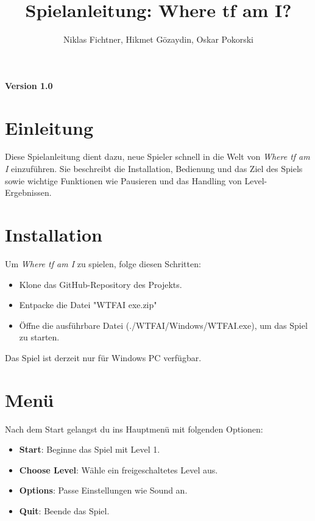 \documentclass[a4paper,12pt]{article}
\title{Spielanleitung: Where tf am I?}
\author{Niklas Fichtner, Hikmet Gözaydin, Oskar Pokorski}
\begin{document}
\maketitle

\begin{center}
\textbf{Version 1.0}
\end{center}

\tableofcontents
\newpage

\section*{Einleitung}
Diese Spielanleitung dient dazu, neue Spieler schnell in die Welt von \textit{Where tf am I} einzuführen. Sie beschreibt die Installation, Bedienung und das Ziel des Spiels sowie wichtige Funktionen wie Pausieren und das Handling von Level-Ergebnissen.

\newpage

\section{Installation}
\label{sec:installation}

Um \textit{Where tf am I} zu spielen, folge diesen Schritten:

\begin{itemize}
    \item Klone das GitHub-Repository des Projekts.
    \item Entpacke die Datei "WTFAI exe.zip"
    \item Öffne die ausführbare Datei (./WTFAI/Windows/WTFAI.exe), um das Spiel zu starten.
\end{itemize}

Das Spiel ist derzeit nur für Windows PC verfügbar.

\newpage

\section{Menü}
\label{sec:menu}

Nach dem Start gelangst du ins Hauptmenü mit folgenden Optionen:

\begin{itemize}
    \item \textbf{Start}: Beginne das Spiel mit Level 1.
    \item \textbf{Choose Level}: Wähle ein freigeschaltetes Level aus.
    \item \textbf{Options}: Passe Einstellungen wie Sound an.
    \item \textbf{Quit}: Beende das Spiel.
\end{itemize}
\end{document}
